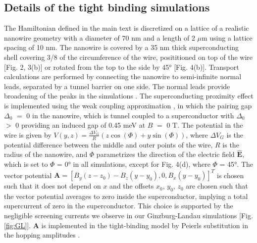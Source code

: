 \documentclass[prl,singlecolumn,notitlepage,secnumroman,superscriptaddress,nobibnotes,graphicx,amsmath,amssymb]{revtex4-2}
\begin{document}
\subsection{Details of the tight binding simulations}
The Hamiltonian defined in the main text is discretized on a lattice of a realistic nanowire geometry with a diameter of 70 nm and a length of 2 $\mu$m using a lattice spacing of 10 nm. The nanowire is covered by a 35 nm thick superconducting shell covering 3/8 of the circumference of the wire, posititioned on top of the wire [Fig. 2, 3(b)] or rotated from the top to the side by \ang{45} [Fig. 4(b)]. Transport calculations are performed by connecting the nanowire to semi-infinite normal leads, separated by a tunnel barrier on one side. The normal leads provide broadening of the peaks in the simulations \cite{Liu2017,Danon2017}. The superconducting proximity effect is implemented using the weak coupling approximation \cite{Nijholt2016}, in which the pairing gap $\Delta_0$ $=$ 0 in the nanowire, which is tunnel coupled to a superconductor with $\Delta_0$ $>$ 0 providing an induced gap of 0.45 meV at $B$ $=$ 0 T. The potential in the wire is given by $V(y,z)= \frac{\Delta V_G}{R} (z\cos(\Phi)+y\sin(\Phi))$, where $\Delta V_G$ is the potential difference between the middle and outer points of the wire, $R$ is the radius of the nanowire, and $\Phi$ parametrizes the direction of the electric field $\mathbf{\hat{E}}$, which is set to $\Phi$ = \ang{0} in all simulations, except for Fig. 4(d), where $\Phi$ = \ang{45}. The vector potential $\mathbf{A} = \left[B_y(z-z_0)-B_z(y-y_0),0,B_x(y-y_0)\right]^T$ is chosen such that it does not depend on $x$ and the offsets $x_0$, $y_0$, $z_0$ are chosen such that the vector potential averages to zero inside the superconductor, implying a total supercurrent of zero in the superconductor. This choice is supported by the negligible screening currents we observe in our Ginzburg-Landau simulations [Fig. \ref{fig:GL}]. $\mathbf{A}$ is implemented in the tight-binding model by Peierls substitution in the hopping amplitudes \cite{Hofstader1976}.
\end{document}
